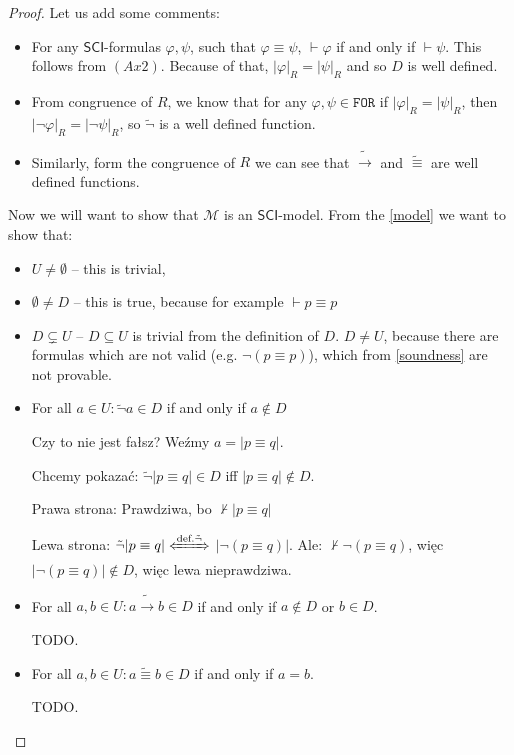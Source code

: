 \documentclass{article}
\theoremstyle{definition}
\newcommand*{\id}{\equiv}
\newcommand*{\ra}{\rightarrow}
\newcommand*{\FOR}{\texttt{FOR}}
\newcommand{\SCI}{$\mathsf{SCI}$\xspace}
\begin{document}
\begin{proof}
    Let us add some comments:
    \begin{itemize}
        \item For any \SCI-formulas $\varphi, \psi$, such that $\varphi \id \psi$, $\vdash
                  \varphi$ if and only if $\vdash \psi$. This follows from $(Ax2)$. Because of
              that, $|\varphi|_R = |\psi|_R$ and so $D$ is well defined.
        \item From congruence of $R$, we know that for any $\varphi, \psi \in \FOR$ if
              $|\varphi|_R = |\psi|_R$, then $|\lnot \varphi|_R = |\lnot \psi|_R$, so
              $\tilde{\lnot}$ is a well defined function.
        \item Similarly, form the congruence of $R$ we can see that $\tilde{\ra}$ and
              $\tilde{\id}$ are well defined functions.
    \end{itemize}

    Now we will want to show that $\mathcal{M}$ is an \SCI-model. From the
    \cref{model} we want to show that:
    \begin{itemize}
        \item $U \not = \emptyset$ -- this is trivial,
        \item $\emptyset \not = D$ -- this is true, because for example $\vdash p \id p$
        \item $D \subsetneq U$ --  $D \subseteq U$ is trivial from the definition of $D$. $D \not = U$, because there are formulas which are not valid (e.g. $\lnot(p \id p)$), which from \cref{soundness} are not provable.
        \item For all $a \in U: \tilde{\lnot} a \in D$ if and only if $a \not \in D$

              {\color{red} Czy to nie jest fałsz? Weźmy $a=|p\id q|$.

                      Chcemy pokazać: $\tilde{\lnot}|p \id q| \in D$ iff $|p \id q| \not \in D$.

                      Prawa strona: Prawdziwa, bo $\not \vdash |p \id q|$

                      Lewa strona: $\tilde{\lnot}|p \id q| \xLeftrightarrow{\text{def.}
                              \tilde{\lnot}}$ $|\lnot(p \id q)|$. Ale: $\not \vdash \lnot(p \id q)$, więc
                      $|\lnot(p \id q)| \not \in D$, więc lewa nieprawdziwa.}
        \item For all $a, b \in U: a \tilde{\ra}b \in D$ if and only if $a \not \in D$ or $b
                  \in D$.

              TODO.
        \item For all $a, b \in U: a \tilde{\id}b \in D$ if and only if $a = b$.

              TODO.
    \end{itemize}
\end{proof}
\end{document}

